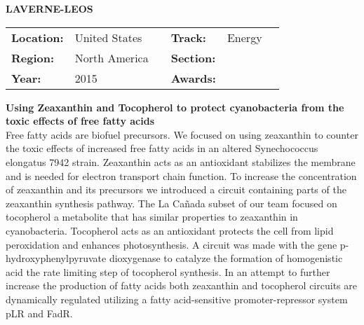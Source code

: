 \textbf{\uppercase{LaVerne-Leos}} \FloatBarrier \begin{table}[h] \begin{tabular}{lp{2.5cm}llll} \textbf{Location:} & United States & \multicolumn{1}{|l}{} & \textbf{Track:}   & Energy \\ \textbf{Region:}   & North America   & \multicolumn{1}{|l}{} & \textbf{Section:} &  \\ \textbf{Year:}     & 2015   & \multicolumn{1}{|l}{} & \textbf{Awards:}  & \end{tabular} \end{table} \FloatBarrier \noindent\textbf{Using Zeaxanthin and Tocopherol to protect cyanobacteria from the toxic effects of free fatty acids} \vspace{.2cm}\\ Free fatty acids are biofuel precursors.  We focused on using zeaxanthin to counter the toxic effects of increased free fatty acids in an altered Synechococcus elongatus 7942 strain. Zeaxanthin acts as an antioxidant stabilizes the membrane and is needed for electron transport chain function. To increase the concentration of zeaxanthin and its precursors we introduced a circuit containing parts of the zeaxanthin synthesis pathway. The La Cañada subset of our team focused on tocopherol a metabolite that has similar properties to zeaxanthin in cyanobacteria. Tocopherol acts as an antioxidant protects the cell from lipid peroxidation and enhances photosynthesis. A circuit was made with the gene p-hydroxyphenylpyruvate dioxygenase to catalyze the formation of homogenistic acid the rate limiting step of tocopherol synthesis. In an attempt to further increase the production of fatty acids both zeaxanthin and tocopherol circuits are dynamically regulated utilizing a fatty acid-sensitive promoter-repressor system pLR and FadR.
\vspace{2cm} $ $
\pagebreak

